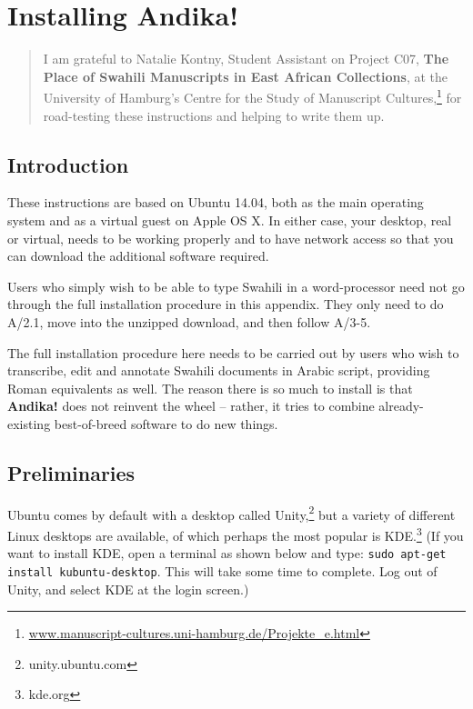\chapter{Installing \textbf{Andika!}}
\renewcommand{\thesection}{A/\arabic{section}}  %
\setcounter{section}{0}  %
\label{appA}

\begin{quotation}
\noindent I am grateful to Natalie Kontny, Student Assistant on Project C07, \textbf{The Place of Swahili Manuscripts in East African Collections},  at the University of Hamburg's Centre for the Study of Manuscript Cultures,\footnote{\url{www.manuscript-cultures.uni-hamburg.de/Projekte_e.html}} for road-testing these instructions and helping to write them up.
\end{quotation}

\section{Introduction}

These instructions are based on Ubuntu 14.04, both as the main operating system and as a virtual guest on Apple OS X. In either case, your desktop, real or virtual, needs to be working properly and to have network access so that you can download the additional software required.

Users who simply wish to be able to type Swahili in a word-processor need not go through the full installation procedure in this appendix.  They only need to do A/2.1, move into the unzipped download, and then follow A/3-5.

The full installation procedure here needs to be carried out by users who wish to transcribe, edit and annotate Swahili documents in Arabic script, providing Roman equivalents as well.  The reason there is so much to install is that \textbf{Andika!} does not reinvent the wheel -- rather, it tries to combine already-existing best-of-breed software to do new things.


\section{Preliminaries}

Ubuntu comes by default with a desktop called Unity,\footnote{unity.ubuntu.com} but a variety of different Linux desktops are available, of which perhaps the most popular is KDE.\footnote{kde.org}  (If you want to install KDE, open a terminal as shown below and type: \verb|sudo apt-get install kubuntu-desktop|.  This will take some time to complete.  Log out of Unity, and select KDE at the login screen.)

